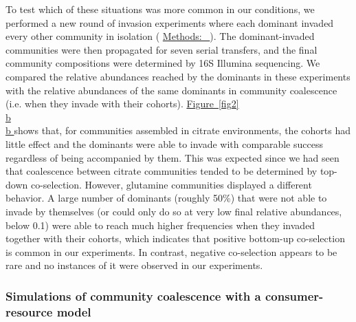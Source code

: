 \documentclass[a4paper,10pt]{article}
\newcommand{\figref}[2][]{%
  \hyperref[{#2}]{%
    Figure~\ref*{#2}%
    \ifx\\#1\\%
    \else
      #1%
    \fi
  }%
}
\newcommand{\methodsref}[1]{%
  \hyperref[{methods:#1}]{%
   Methods:~\nameref*{methods:#1}%
  }%
}
\begin{document}
To test which of these situations was more common in our conditions,
we performed a new round of invasion experiments where each dominant invaded every
other community in isolation (\methodsref{competitions}). The dominant-invaded
communities were then propagated for seven serial transfers, and the final
community compositions were determined by 16S Illumina sequencing.
We compared the relative abundances reached by the dominants in these experiments
with the relative abundances of the same dominants in community coalescence
(i.e. when they invade with their cohorts).
\figref[b]{fig2} shows that, for communities assembled in citrate environments,
the cohorts had little effect and the dominants were able to invade with comparable
success regardless of being accompanied by them.
This was expected since we had seen that coalescence between citrate communities
tended to be determined by top-down co-selection.
However, glutamine communities displayed a different behavior.
A large number of dominants (roughly 50\%) that were not able to invade by themselves
(or could only do so at very low final relative abundances, below 0.1)
were able to reach much higher frequencies when they invaded together with their cohorts,
which indicates that positive bottom-up co-selection is common in our experiments.
In contrast, negative co-selection appears to be rare and no instances of it were
observed in our experiments.

\subsubsection*{Simulations of community coalescence with a consumer-resource model}
\end{document}
